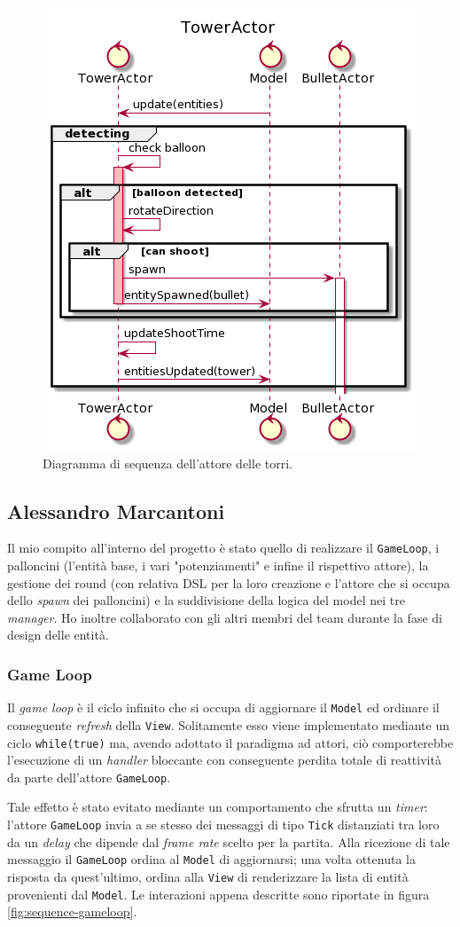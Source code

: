 \begin{figure}[H]
    \centering
    \includegraphics[width=.5\linewidth]{img/tower-actor}
    \caption{Diagramma di sequenza dell'attore delle torri.}
    \label{fig:tower-actor}
\end{figure}

\subsection{Alessandro Marcantoni}
Il mio compito all'interno del progetto è stato quello di realizzare il \texttt{GameLoop}, i palloncini (l'entità base,
i vari "potenziamenti" e infine il rispettivo attore), la gestione dei round (con relativa DSL per la loro creazione e
l'attore che si occupa dello \textit{spawn} dei palloncini) e la suddivisione della logica del model nei tre
\textit{manager}. Ho inoltre collaborato con gli altri membri del team durante la fase di design delle entità.

\subsubsection{Game Loop}
Il \textit{game loop} è il ciclo infinito che si occupa di aggiornare il \texttt{Model} ed ordinare il conseguente
\textit{refresh} della \texttt{View}. Solitamente esso viene implementato mediante un ciclo \texttt{while(true)} ma,
avendo adottato il paradigma ad attori, ciò comporterebbe l'esecuzione di un \textit{handler} bloccante con
conseguente perdita totale di reattività da parte dell'attore \texttt{GameLoop}.

Tale effetto è stato evitato mediante un comportamento che sfrutta un \textit{timer}: l'attore \texttt{GameLoop} invia a
se stesso dei messaggi di tipo \texttt{Tick} distanziati tra loro da un \textit{delay} che dipende dal
\textit{frame rate} scelto per la partita. Alla ricezione di tale messaggio il \texttt{GameLoop} ordina al
\texttt{Model} di aggiornarsi; una volta ottenuta la risposta da quest'ultimo, ordina alla \texttt{View} di renderizzare
la lista di entità provenienti dal \texttt{Model}. Le interazioni appena descritte sono riportate in figura
\ref{fig:sequence-gameloop}.

